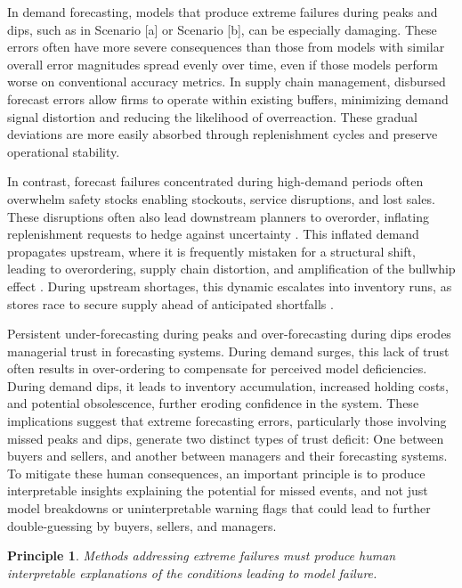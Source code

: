 \documentclass[ijds,sglanonrev]{informs4}
\newtheorem{principle}{Principle}
\begin{document}
In demand forecasting, models that produce extreme failures during peaks and dips, such as in Scenario [a] or Scenario [b], can be especially damaging. These errors often have more severe consequences than those from models with similar overall error magnitudes spread evenly over time, even if those models perform worse on conventional accuracy metrics. In supply chain management, disbursed forecast errors allow firms to operate within existing buffers, minimizing demand signal distortion and reducing the likelihood of overreaction. These gradual deviations are more easily absorbed through  replenishment cycles and preserve operational stability. 

In contrast, forecast failures concentrated during high-demand periods often overwhelm safety stocks enabling stockouts, service disruptions, and lost sales. These disruptions often also lead downstream planners to overorder, inflating replenishment requests to hedge against uncertainty \citep{bray2019}. This inflated demand propagates upstream, where it is frequently mistaken for a structural shift, leading to overordering, supply chain distortion, and amplification of the bullwhip effect \citep{croson2014, wu2006}. During upstream shortages, this dynamic escalates into inventory runs, as stores race to secure supply ahead of anticipated shortfalls \citep{bray2019}. 
 
Persistent under-forecasting during peaks and over-forecasting during dips erodes managerial trust in forecasting systems. During demand surges, this lack of trust often results in over-ordering to compensate for perceived model deficiencies. During demand dips, it leads to inventory accumulation, increased holding costs, and potential obsolescence, further eroding confidence in the system. These implications suggest that extreme forecasting errors, particularly those involving missed peaks and dips, generate two distinct types of trust deficit: One between buyers and sellers, and another between managers and their forecasting systems. To mitigate these human consequences, an important principle is to produce interpretable insights explaining the potential for missed events, and not just model breakdowns or uninterpretable warning flags that could lead to further double-guessing by buyers, sellers, and managers.

\begin{principle}
\textit{Methods addressing extreme failures must produce human interpretable explanations of the conditions leading to model failure.}
\end{principle}
\end{document}
